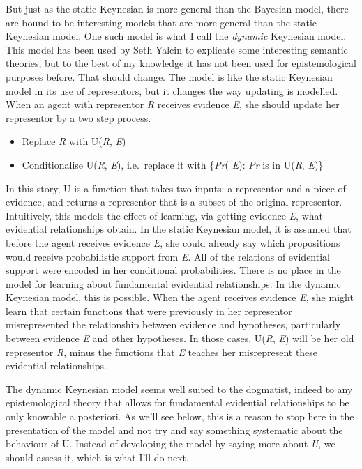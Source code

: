 \documentclass[
  11pt,
  letterpaper,
  DIV=11,
  numbers=noendperiod,
  oneside]{scrartcl}
\begin{document}
But just as the static Keynesian is more general than the Bayesian
model, there are bound to be interesting models that are more general
than the static Keynesian model. One such model is what I call the
\emph{dynamic} Keynesian model. This model has been used by Seth Yalcin
to explicate some interesting semantic theories, but to the best of my
knowledge it has not been used for epistemological purposes before. That
should change. The model is like the static Keynesian model in its use
of representors, but it changes the way updating is modelled. When an
agent with representor \emph{R} receives evidence \emph{E}, she should
update her representor by a two step process.

\begin{itemize}
\item
  Replace \emph{R} with U(\emph{R}, \emph{E})
\item
  Conditionalise U(\emph{R}, \emph{E}), i.e.~replace it with
  \{\emph{Pr}( \emph{E}): \emph{Pr} is in U(\emph{R}, \emph{E})\}
\end{itemize}

In this story, U is a function that takes two inputs: a representor and
a piece of evidence, and returns a representor that is a subset of the
original representor. Intuitively, this models the effect of learning,
via getting evidence \emph{E}, what evidential relationships obtain. In
the static Keynesian model, it is assumed that before the agent receives
evidence \emph{E}, she could already say which propositions would
receive probabilistic support from \emph{E}. All of the relations of
evidential support were encoded in her conditional probabilities. There
is no place in the model for learning about fundamental evidential
relationships. In the dynamic Keynesian model, this is possible. When
the agent receives evidence \emph{E}, she might learn that certain
functions that were previously in her representor misrepresented the
relationship between evidence and hypotheses, particularly between
evidence \emph{E} and other hypotheses. In those cases, U(\emph{R},
\emph{E}) will be her old representor \emph{R}, minus the functions that
\emph{E} teaches her misrepresent these evidential relationships.

The dynamic Keynesian model seems well suited to the dogmatist, indeed
to any epistemological theory that allows for fundamental evidential
relationships to be only knowable a posteriori. As we'll see below, this
is a reason to stop here in the presentation of the model and not try
and say something systematic about the behaviour of U. Instead of
developing the model by saying more about \emph{U}, we should assess it,
which is what I'll do next.
\end{document}
